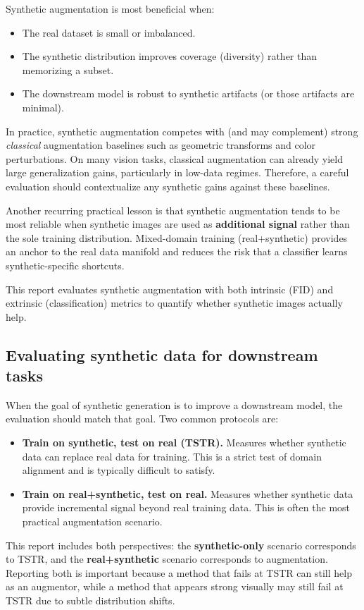 Synthetic augmentation is most beneficial when:
\begin{itemize}
\item The real dataset is small or imbalanced.
\item The synthetic distribution improves coverage (diversity) rather than memorizing a subset.
\item The downstream model is robust to synthetic artifacts (or those artifacts are minimal).
\end{itemize}

In practice, synthetic augmentation competes with (and may complement) strong \emph{classical} augmentation baselines such as geometric transforms and color perturbations. On many vision tasks, classical augmentation can already yield large generalization gains, particularly in low-data regimes. Therefore, a careful evaluation should contextualize any synthetic gains against these baselines.

Another recurring practical lesson is that synthetic augmentation tends to be most reliable when synthetic images are used as \textbf{additional signal} rather than the sole training distribution. Mixed-domain training (real+synthetic) provides an anchor to the real data manifold and reduces the risk that a classifier learns synthetic-specific shortcuts.

This report evaluates synthetic augmentation with both intrinsic (FID) and extrinsic (classification) metrics to quantify whether synthetic images actually help.

\subsection{Evaluating synthetic data for downstream tasks}

When the goal of synthetic generation is to improve a downstream model, the evaluation should match that goal. Two common protocols are:
\begin{itemize}
\item \textbf{Train on synthetic, test on real (TSTR).} Measures whether synthetic data can replace real data for training. This is a strict test of domain alignment and is typically difficult to satisfy.
\item \textbf{Train on real+synthetic, test on real.} Measures whether synthetic data provide incremental signal beyond real training data. This is often the most practical augmentation scenario.
\end{itemize}

This report includes both perspectives: the \textbf{synthetic-only} scenario corresponds to TSTR, and the \textbf{real+synthetic} scenario corresponds to augmentation. Reporting both is important because a method that fails at TSTR can still help as an augmentor, while a method that appears strong visually may still fail at TSTR due to subtle distribution shifts.
